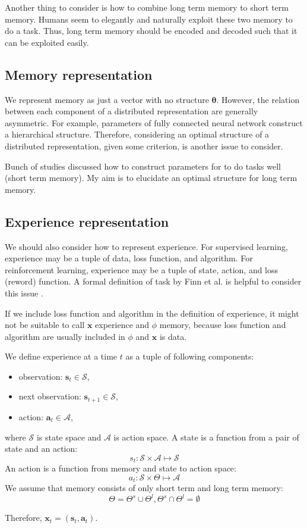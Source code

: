 \documentclass[12pt]{article}
\begin{document}
Another thing to consider is how to combine long term memory to short term memory. 
Humans seem to elegantly and naturally exploit these two memory to do a task. Thus, 
long term memory should be encoded and decoded such that it can be exploited easily. 

\subsection{Memory representation}
We represent memory as just a vector with no structure $\bm{\theta}$. However, 
the relation between each component of a distributed representation are generally asymmetric. 
For example, parameters of fully connected neural network construct a hierarchical structure. 
Therefore, considering an optimal structure of a distributed representation, given 
some criterion, is another issue to consider. 

Bunch of studies discussed how to construct parameters for to do tasks well (short term memory). 
My aim is to elucidate an optimal structure for long term memory. 

\subsection{Experience representation}
We should also consider how to represent experience. For supervised learning, experience may be 
a tuple of data, loss function, and algorithm. For reinforcement learning, experience may be a tuple 
of state, action, and loss (reword) function. A formal definition of task by Finn et al. is 
helpful to consider this issue \cite{Finn17}. 

If we include loss function and algorithm in the definition of experience, it might not be 
suitable to call $\bm{x}$ experience and $\phi$ memory, because loss function and algorithm 
are usually included in $\phi$ and $\bm{x}$ is data.

We define experience at a time $t$ as a tuple of following components:
\begin{itemize}
    \item observation: $\bm{s}_t \in \mathcal{S}$,
    \item next observation: $\bm{s}_{t+1} \in \mathcal{S}$,
    \item action: $\bm{a}_t \in \mathcal{A}$,
\end{itemize}
where $\mathcal{S}$ is state space and $\mathcal{A}$ is action space. 
A state is a function from a pair of state and an action:
\begin{equation}
    s_t: \mathcal{S} \times \mathcal{A} \mapsto \mathcal{S}
\end{equation}
An action is a function from memory and state to action space:
\begin{equation}
    a_t: \mathcal{S} \times \Theta \mapsto \mathcal{A}
\end{equation}
We assume that memory consists of only short term and long term memory:
\begin{equation}
    \Theta = \Theta^s \cup \Theta^l, \Theta^s \cap \Theta^l = \emptyset
\end{equation}

Therefore, $\bm{x}_t = (\bm{s}_t, \bm{a}_t)$.








\end{document}

